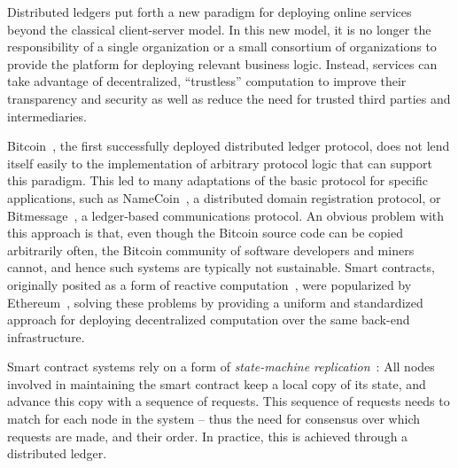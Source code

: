Distributed ledgers put forth a new paradigm for deploying online services
beyond the classical client-server model. In this new model, it is no
longer the responsibility of a single organization or a small consortium of
organizations to provide the platform for deploying relevant business
logic.
Instead, services can take advantage of decentralized, ``trustless'' computation
to improve their transparency and security as well as reduce the need for
trusted third parties and intermediaries.

\sloppy
Bitcoin~\cite{bitcoin}, the first successfully deployed distributed ledger protocol, 
 does not lend itself easily to the implementation of arbitrary 
 protocol logic that can support this paradigm.  
This led to many adaptations of the basic protocol for specific applications, such as NameCoin~\cite{namecoin}, a distributed domain
registration protocol, or Bitmessage~\cite{bitmessage}, a ledger-based communications
protocol. An obvious problem with this approach
is that, even though the Bitcoin
source code can be copied arbitrarily often, the Bitcoin community of software
developers and miners cannot, and hence such systems are typically
not sustainable. 
Smart contracts, originally posited as a form of reactive
computation~\cite{szabo1997formalizing}, were popularized by
Ethereum~\cite{ethereum}, solving these problems
by providing a uniform and standardized approach for deploying decentralized
computation over the same back-end infrastructure.

\fussy

Smart contract systems rely on a form of \emph{state-machine
  replication}~\cite{statemachinereplication}: All nodes involved in
maintaining the smart contract keep a local copy of its state, and advance this copy
with a sequence of requests. This sequence of requests needs to match for each
node in the system -- thus the need for consensus over which requests are made,
and their order. In practice, this is achieved through a distributed ledger.

